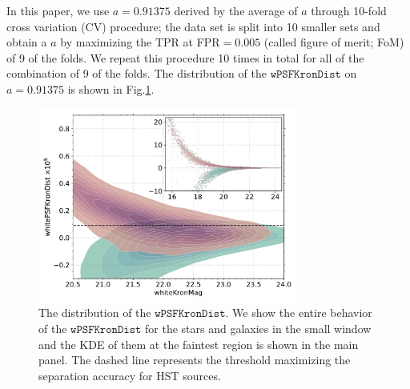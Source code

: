 \documentclass[twocolumn]{aastex62}
\begin{document}
{In this paper, we use $a=0.91375$ derived by the average of $a$ 
through 10-fold cross variation (CV) procedure;   
the data set is split into 10 smaller sets 
and obtain a $a$ by maximizing the TPR at FPR$ = 0.005$ 
(called figure of merit; FoM) of 9 of the folds. 
We repeat this procedure 10 times in total for all of the combination of 9 of the folds. 
The distribution of the $\mathtt{wPSFKronDist}$ on $a=0.91375$ is shown in Fig.\ref{fig:psfkrondist}. 

\begin{figure}[t]
 \centering
  \includegraphics[width=3.35in, bb = 0 0 576 432]{./Figures/whitePSFKronDist.pdf}
  \caption{{The distribution of the $\mathtt{wPSFKronDist}$. 
  We show the entire behavior of the $\mathtt{wPSFKronDist}$ for the stars and galaxies 
  in the small window and the KDE of them at the faintest region is shown in the main panel.  
  The dashed line represents the threshold maximizing the separation accuracy for HST sources. }
 }
  \label{fig:psfkrondist}
\end{figure}
}
\end{document}
